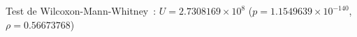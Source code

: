 Test de Wilcoxon-Mann-Whitney : $U = 2.7308169 \times 10^{8}$ ($p = 1.1549639 \times 10^{-140}$, $ρ = 0.56673768$)
